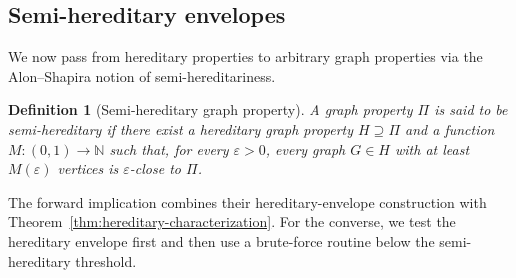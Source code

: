 \documentclass[11pt,reqno,letterpaper]{amsart}
\newcommand{\N}{{\mathbb N}}
\theoremstyle{plain}
\newtheorem{defn}[thm]{Definition}
\theoremstyle{remark}
\begin{document}
\subsection{Semi-hereditary envelopes}

We now pass from hereditary properties to arbitrary graph properties via the Alon--Shapira notion of semi-hereditariness. 

\begin{defn}[Semi-hereditary graph property]
A graph property $\Pi$ is said to be \textit{semi-hereditary} if there exist a hereditary graph property $H\supseteq \Pi$ and a function $M:(0,1)\to\N$ such that, for every $\varepsilon>0$, every graph $G\in H$ with at least $M(\varepsilon)$ vertices is $\varepsilon$-close to $\Pi$.
\end{defn}

The forward implication combines their hereditary-envelope construction with Theorem~\ref{thm:hereditary-characterization}. For the converse, we test the hereditary envelope first and then use a brute-force routine below the semi-hereditary threshold.
\end{document}
